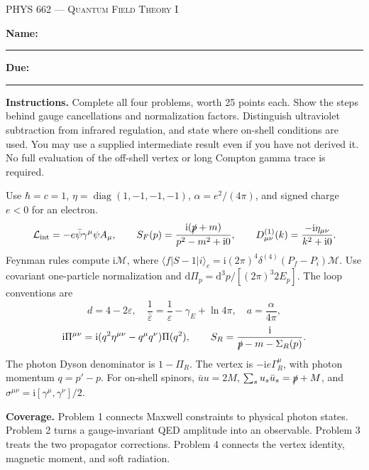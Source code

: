 \documentclass[11pt]{article}
\newcommand{\dd}{\mathrm d}
\newcommand{\ii}{\mathrm i}
\newcommand{\eps}{\varepsilon}
\newcommand{\diag}{\operatorname{diag}}
\newcommand{\Lag}{\mathcal L}
\newcommand{\cM}{\mathcal M}
\begin{document}
\begin{center}
{\scshape\Large PHYS 662 --- Quantum Field Theory I\par}
\vspace{0.3em}{\large Quantum Electrodynamics: Photons, Amplitudes, and Loops\par}
\vspace{0.3em}{\large Lectures 26--29 \quad Fall 2026\par}
\end{center}\medskip
\textbf{Name:} \rule{0.43\textwidth}{0.4pt}\hfill
\textbf{Due:} \rule{0.24\textwidth}{0.4pt}

\textbf{Instructions.} Complete all four problems, worth 25 points each.
Show the steps behind gauge cancellations and normalization factors.
Distinguish ultraviolet subtraction from infrared regulation, and state
where on-shell conditions are used. You may use a supplied intermediate
result even if you have not derived it. No full evaluation of the
off-shell vertex or long Compton gamma trace is required.

\begin{keyidea}
Use \(\hbar=c=1\), \(\eta=\diag(1,-1,-1,-1)\),
\(\alpha=e^2/(4\pi)\), and signed charge \(e<0\) for an electron.
\[
 \Lag_{\rm int}=-e\bar\psi\gamma^\mu\psi A_\mu,\qquad
 S_F(p)=\frac{\ii(\slashed p+m)}{p^2-m^2+\ii0},\qquad
 D_{\mu\nu}^{(1)}(k)=\frac{-\ii\eta_{\mu\nu}}{k^2+\ii0}.
\]
Feynman rules compute \(\ii\cM\), where
\(\langle f|S-1|i\rangle_c=\ii(2\pi)^4\delta^{(4)}(P_f-P_i)\cM\).
Use covariant one-particle normalization and
\(\dd\Pi_p=\dd^3p/[(2\pi)^3 2E_p]\). The loop conventions are
\[
 d=4-2\eps,\quad \frac1{\bar\eps}=\frac1\eps-\gamma_E+\ln4\pi,
 \quad a=\frac{\alpha}{4\pi},
\]
\[
 \ii\Pi^{\mu\nu}=\ii(q^2\eta^{\mu\nu}-q^\mu q^\nu)\Pi(q^2),\qquad
 S_R=\frac{\ii}{\slashed p-m-\Sigma_R(p)}.
\]
The photon Dyson denominator is \(1-\Pi_R\). The vertex is
\(-\ii e\Gamma_R^\mu\), with photon momentum \(q=p'-p\).
For on-shell spinors, \(\bar u u=2M\),
\(\sum_su_s\bar u_s=\slashed p+M\), and
\(\sigma^{\mu\nu}=\ii[\gamma^\mu,\gamma^\nu]/2\).
\end{keyidea}

\textbf{Coverage.} Problem 1 connects Maxwell constraints to physical
photon states. Problem 2 turns a gauge-invariant QED amplitude into an
observable. Problem 3 treats the two propagator corrections. Problem 4
connects the vertex identity, magnetic moment, and soft radiation.
\end{document}

